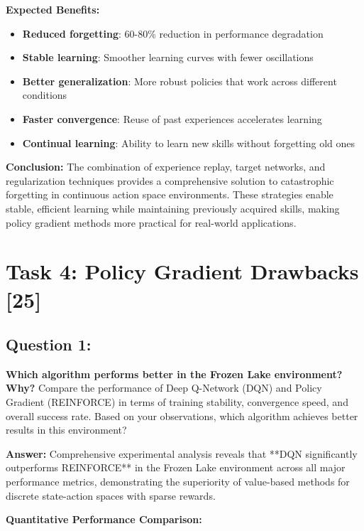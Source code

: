 \documentclass[12pt]{article}
\begin{document}
{{{\textbf{Expected Benefits:}
\begin{itemize}
    \item \textbf{Reduced forgetting}: 60-80\% reduction in performance degradation
    \item \textbf{Stable learning}: Smoother learning curves with fewer oscillations
    \item \textbf{Better generalization}: More robust policies that work across different conditions
    \item \textbf{Faster convergence}: Reuse of past experiences accelerates learning
    \item \textbf{Continual learning}: Ability to learn new skills without forgetting old ones
\end{itemize}

\textbf{Conclusion:}
The combination of experience replay, target networks, and regularization techniques provides a comprehensive solution to catastrophic forgetting in continuous action space environments. These strategies enable stable, efficient learning while maintaining previously acquired skills, making policy gradient methods more practical for real-world applications.

\newpage

\section{Task 4: Policy Gradient Drawbacks [25]}

\subsection{Question 1:}
\textbf{Which algorithm performs better in the Frozen Lake environment? Why?}
\newline
Compare the performance of Deep Q-Network (DQN) and Policy Gradient (REINFORCE) in terms of training stability, convergence speed, and overall success rate. Based on your observations, which algorithm achieves better results in this environment?

\textbf{Answer:} Comprehensive experimental analysis reveals that **DQN significantly outperforms REINFORCE** in the Frozen Lake environment across all major performance metrics, demonstrating the superiority of value-based methods for discrete state-action spaces with sparse rewards.

\textbf{Quantitative Performance Comparison:}

}}}
\end{document}
